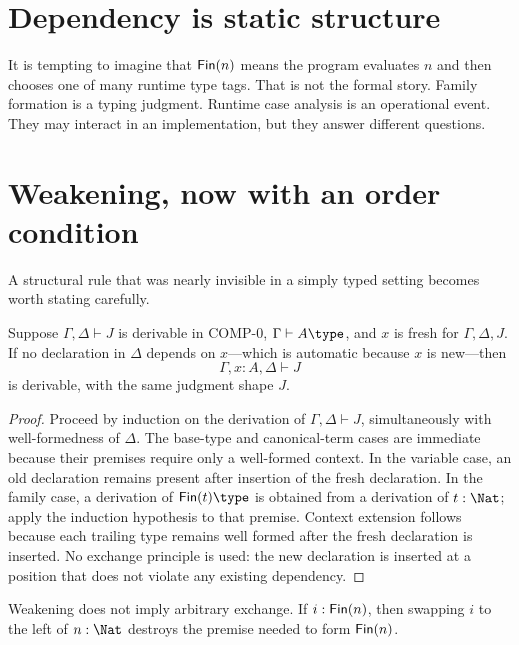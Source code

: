 \documentclass[11pt,openany]{book}
\begin{document}
\section{Dependency is static structure}

It is tempting to imagine that $\mathsf{Fin}(n)$ means the program evaluates $n$ and then chooses one of many runtime type tags. That is not the formal story. Family formation is a typing judgment. Runtime case analysis is an operational event. They may interact in an implementation, but they answer different questions.



\section{Weakening, now with an order condition}

A structural rule that was nearly invisible in a simply typed setting becomes worth stating carefully.

\begin{theorem}
Suppose $\Gamma,\Delta\vdash J$ is derivable in COMP-0, $\Gamma\vdash A\type$, and $x$ is fresh for $\Gamma,\Delta,J$. If no declaration in $\Delta$ depends on $x$---which is automatic because $x$ is new---then
\[
  \Gamma,x:A,\Delta\vdash J
\]
is derivable, with the same judgment shape $J$.
\end{theorem}

\begin{proof}
Proceed by induction on the derivation of $\Gamma,\Delta\vdash J$, simultaneously with well-formedness of $\Delta$. The base-type and canonical-term cases are immediate because their premises require only a well-formed context. In the variable case, an old declaration remains present after insertion of the fresh declaration. In the family case, a derivation of $\Fin(t)\type$ is obtained from a derivation of $t:\Nat$; apply the induction hypothesis to that premise. Context extension follows because each trailing type remains well formed after the fresh declaration is inserted. No exchange principle is used: the new declaration is inserted at a position that does not violate any existing dependency.
\end{proof}

\begin{warningbox}
Weakening does not imply arbitrary exchange. If $i:\mathsf{Fin}(n)$, then swapping $i$ to the left of $n:\Nat$ destroys the premise needed to form $\mathsf{Fin}(n)$.
\end{warningbox}
\end{document}
